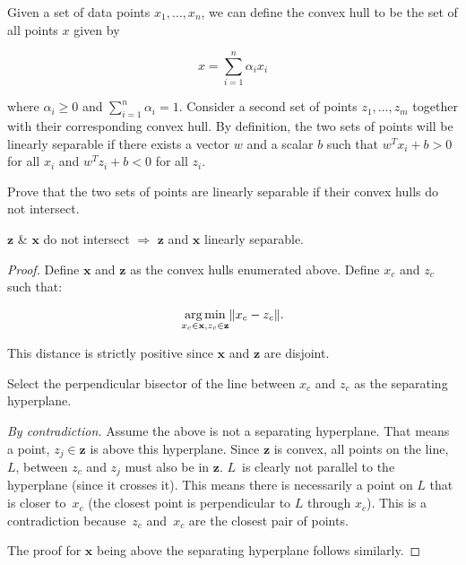 \begin{problem}
Given a set of data points $x_1,\ldots,x_n$, we can define the convex hull to be the set of all points $x$ given by

\[x = \sum_{i=1}^{n} \alpha_i x_i \]

\noindent
where $\alpha_{i} \geq 0$ and $\sum_{i=1}^{n} \alpha_i = 1$. Consider a second set of points $z_1,\ldots,z_m$ together with their corresponding convex hull. By definition, the two sets of points will be linearly separable if there exists a vector $w$ and a scalar $b$ such that $w^{T}x_i + b > 0$ for all $x_i$ and $w^{T}z_i + b < 0$ for all $z_i$.

Prove that the two sets of points are linearly separable if their convex hulls do not intersect.
\end{problem}

\begin{lemma}
  $\mathbf{z}$ \& $\mathbf{x}$ do not intersect $\Rightarrow$ $\mathbf{z}$ and $\mathbf{x}$ linearly separable.
\end{lemma}

\begin{proof}

  Define $\mathbf{x}$ and $\mathbf{z}$ as the convex hulls enumerated above. Define $x_c$ and $z_c$ such that:

  \[ \operatorname*{arg\,min}_{x_c \in \mathbf{x}, z_c \in \mathbf{z}} \lVert x_c - z_c\rVert \text{.} \]

  \noindent
  This distance is strictly positive since $\mathbf{x}$ and $\mathbf{z}$ are disjoint.

  Select the perpendicular bisector of the line between $x_c$ and $z_c$ as the separating hyperplane.  %


\textit{By contradiction.}  Assume the above is not a separating hyperplane.  That means a point, $z_j\in\mathbf{z}$ is above this hyperplane.  Since $\mathbf{z}$ is convex, all points on the line,~$L$, between $z_c$ and $z_j$ must also be in $\mathbf{z}$.  $L$~is clearly not parallel to the hyperplane (since it crosses it).  This means there is necessarily a point on $L$ that is closer to~$x_c$ (the closest point is perpendicular to $L$ through $x_c$).  This is a contradiction because~$z_c$ and~$x_c$ are the closest pair of points.

The proof for $\mathbf{x}$ being above the separating hyperplane follows similarly.
\end{proof}

